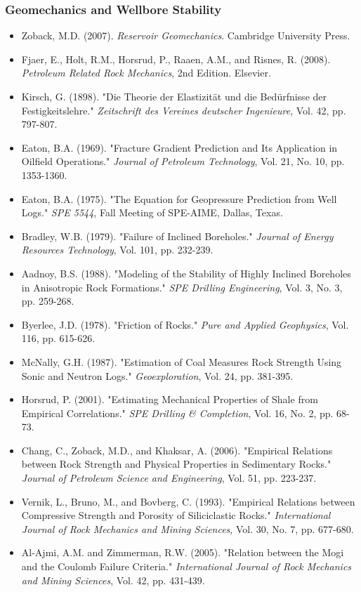 \documentclass[11pt,a4paper]{article}
\begin{document}
\subsubsection{Geomechanics and Wellbore Stability}
\begin{itemize}
\item Zoback, M.D. (2007). \textit{Reservoir Geomechanics}. Cambridge University Press.
\item Fjaer, E., Holt, R.M., Horsrud, P., Raaen, A.M., and Risnes, R. (2008). \textit{Petroleum Related Rock Mechanics}, 2nd Edition. Elsevier.
\item Kirsch, G. (1898). "Die Theorie der Elastizität und die Bedürfnisse der Festigkeitslehre." \textit{Zeitschrift des Vereines deutscher Ingenieure}, Vol. 42, pp. 797-807.
\item Eaton, B.A. (1969). "Fracture Gradient Prediction and Its Application in Oilfield Operations." \textit{Journal of Petroleum Technology}, Vol. 21, No. 10, pp. 1353-1360.
\item Eaton, B.A. (1975). "The Equation for Geopressure Prediction from Well Logs." \textit{SPE 5544}, Fall Meeting of SPE-AIME, Dallas, Texas.
\item Bradley, W.B. (1979). "Failure of Inclined Boreholes." \textit{Journal of Energy Resources Technology}, Vol. 101, pp. 232-239.
\item Aadnoy, B.S. (1988). "Modeling of the Stability of Highly Inclined Boreholes in Anisotropic Rock Formations." \textit{SPE Drilling Engineering}, Vol. 3, No. 3, pp. 259-268.
\item Byerlee, J.D. (1978). "Friction of Rocks." \textit{Pure and Applied Geophysics}, Vol. 116, pp. 615-626.
\item McNally, G.H. (1987). "Estimation of Coal Measures Rock Strength Using Sonic and Neutron Logs." \textit{Geoexploration}, Vol. 24, pp. 381-395.
\item Horsrud, P. (2001). "Estimating Mechanical Properties of Shale from Empirical Correlations." \textit{SPE Drilling \& Completion}, Vol. 16, No. 2, pp. 68-73.
\item Chang, C., Zoback, M.D., and Khaksar, A. (2006). "Empirical Relations between Rock Strength and Physical Properties in Sedimentary Rocks." \textit{Journal of Petroleum Science and Engineering}, Vol. 51, pp. 223-237.
\item Vernik, L., Bruno, M., and Bovberg, C. (1993). "Empirical Relations between Compressive Strength and Porosity of Siliciclastic Rocks." \textit{International Journal of Rock Mechanics and Mining Sciences}, Vol. 30, No. 7, pp. 677-680.
\item Al-Ajmi, A.M. and Zimmerman, R.W. (2005). "Relation between the Mogi and the Coulomb Failure Criteria." \textit{International Journal of Rock Mechanics and Mining Sciences}, Vol. 42, pp. 431-439.
\end{itemize}
\end{document}
